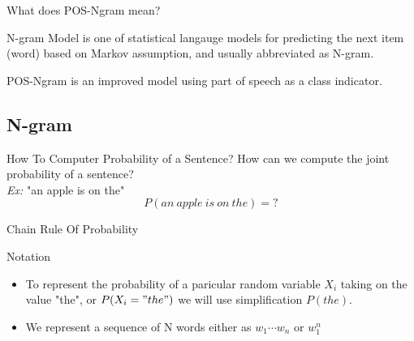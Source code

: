 \documentclass{beamer}
\begin{document}
\begin{frame}{What does POS-Ngram mean?}
    \begin{definition}{N-gram Model}
        is one of statistical langauge models for predicting the next item (word) based on Markov assumption, and usually abbreviated as N-gram.
    \end{definition}
    \begin{definition}{POS-Ngram}
        is an improved model using part of speech as a class indicator.
    \end{definition}
\end{frame}

\subsection{N-gram}

\begin{frame}{How To Computer Probability of a Sentence?}
How can we compute the joint probability of a sentence?\\
\textit{Ex:} "an apple is on the" \\
    $$P(an\ apple\ is\ on\ the) = \text{?}$$

\end{frame}
\begin{frame}{Chain Rule Of Probability}
    \begin{block}{Notation}
        \begin{itemize}
            \item To represent the probability of a paricular random variable $X_i$ taking on the value "the", or $P(X_i="the")$ we will use simplification $P(the)$.
            \item We represent a sequence of N words either as $w_1\cdots w_n$ or $w_1^n$
        \end{itemize}
    \end{block}

\end{frame}
\end{document}
